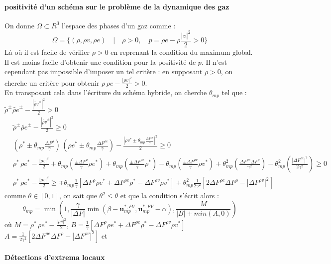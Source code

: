 \paragraph{positivité d'un schéma sur le problème de la dynamique des gaz \\}
On donne $\Omega \subset R^3$ l'espace des phases d'un gaz comme : 
\begin{equation}
    \Omega = \{(\rho,\rho v,\rho e)\quad | \quad \rho >0, \quad p= \rho e - \rho \frac{|v|^2}{2} >0\}
\end{equation}
Là où il est facile de vérifier $\rho >0$ en reprenant la condition du maximum global. Il est moins facile d'obtenir une condition pour la positivité de $p$. 
Il n'est cependant pas impossible d'imposer un tel critère : en supposant $\rho >0$, on cherche un critère pour obtenir $\rho \,\rho e - \frac{|\rho v|^2}{2} >0$.\\
En transposant cela dans l'écriture du schéma hybride, on cherche $\theta_{mp}$ tel que : $\widetilde{\rho}^{\pm} \widetilde{\rho e}^{\pm} - \frac{|\widetilde{\rho v}^{\pm}|^2}{2} >0$
\begin{align*}
    &\widetilde{\rho}^{\pm} \widetilde{\rho e}^{\pm} - \frac{|\widetilde{\rho v}^{\pm}|^2}{2}  \geq 0 \\
    &\left( \rho^*   \pm \theta_{mp}\frac{\Delta F^{\rho  } }{\gamma} \right) \, \left(\rho e^* \pm \theta_{mp}\frac{\Delta F^{\rho e} }{\gamma} \right) - 
     \frac{|\rho v^* \pm \theta_{mp}\frac{\Delta F^{\rho v} }{\gamma}|^2}{2}  \geq 0 \\
    &\rho^* \, \rho e^* - \frac{|\rho v|^2}{2}
    +\theta_{mp}\left(\frac{\pm\Delta F^{\rho  } }{\gamma}\rho e^*  \right)
    +\theta_{mp}\left(\frac{\pm\Delta F^{\rho e} }{\gamma}\rho^*    \right)
    -\theta_{mp}\left(\frac{\pm\Delta F^{\rho v} }{\gamma}\rho v^*    \right)
    +\theta_{mp}^2\left(\frac{\Delta F^{\rho e}\Delta F^{\rho}}{\gamma^2} \right)
    -\theta_{mp}^2\left(\frac{|\Delta F^{\rho v}|^2}{2\gamma^2} \right) \geq 0 \\
    &\rho^* \, \rho e^* - \frac{|\rho v|^2}{2} \geq 
    \mp \theta_{mp} \frac{1}{\gamma}   \left[\Delta F^{\rho} \rho e^* + \Delta F^{\rho e} \rho^* - \Delta F^{\rho v} \rho v^* \right]
    + \theta_{mp}^2 \frac{1}{2\gamma^2}\left[2\Delta F^{\rho e}\Delta F^{\rho}- |\Delta F^{\rho v}|^2\right]
\end{align*}
comme $\theta \in [0,1]$, on sait que $\theta^2 \leq \theta$ et que la condition s'écrit alors : 
\begin{equation}
\theta_{mp} = \min \left(1, \frac{\gamma}{|\Delta F|} \min \left(\beta-\mathbf{u}_{mp}^{*,FV},\mathbf{u}_{mp}^{*,FV} - \alpha  \right)
, \frac{M}{|B|+ min(A,0) } \right) 
\end{equation}
où $M = \rho^* \, \rho e^* - \frac{|\rho v|^2}{2}$, 
$B= \frac{1}{\gamma}   \left[\Delta F^{\rho} \rho e^* + \Delta F^{\rho e} \rho^* - \Delta F^{\rho v} \rho v^* \right]$
$A = \frac{1}{2\gamma^2}\left[2\Delta F^{\rho e}\Delta F^{\rho}- |\Delta F^{\rho v}|^2\right]$ et 
\paragraph{Détections d'extrema locaux}